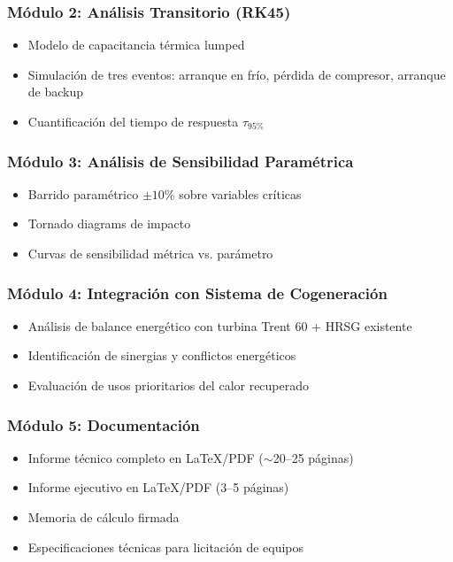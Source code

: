 \documentclass[11pt,a4paper]{article}
\begin{document}
\subsubsection{Módulo 2: Análisis Transitorio (RK45)}
\begin{itemize}
  \item Modelo de capacitancia térmica lumped
  \item Simulación de tres eventos: arranque en frío, pérdida de compresor, arranque de backup
  \item Cuantificación del tiempo de respuesta $\tau_{95\%}$
\end{itemize}

\subsubsection{Módulo 3: Análisis de Sensibilidad Paramétrica}
\begin{itemize}
  \item Barrido paramétrico $\pm 10\%$ sobre variables críticas
  \item Tornado diagrams de impacto
  \item Curvas de sensibilidad métrica vs. parámetro
\end{itemize}

\subsubsection{Módulo 4: Integración con Sistema de Cogeneración}
\begin{itemize}
  \item Análisis de balance energético con turbina Trent 60 + HRSG existente
  \item Identificación de sinergias y conflictos energéticos
  \item Evaluación de usos prioritarios del calor recuperado
\end{itemize}

\subsubsection{Módulo 5: Documentación}
\begin{itemize}
  \item Informe técnico completo en LaTeX/PDF ($\sim$20--25 páginas)
  \item Informe ejecutivo en LaTeX/PDF (3--5 páginas)
  \item Memoria de cálculo firmada
  \item Especificaciones técnicas para licitación de equipos
\end{itemize}
\end{document}
